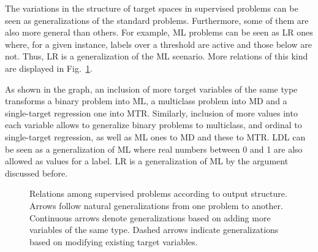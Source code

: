 \documentclass[
	fontsize=11pt, %
	twoside=false, %
	open=any, %
	secnumdepth=1, %
]{kaobook}
\begin{document}
The variations in the structure of target spaces in supervised problems can be seen as generalizations of the standard problems. Furthermore, some of them are also more general than others. For example, ML problems can be seen as LR ones where, for a given instance, labels over a threshold are active and those below are not. Thus, LR is a generalization of the ML scenario. More relations of this kind are displayed in Fig.~\ref{fig.mouttax}.

As shown in the graph, an inclusion of more target variables of the same type transforms a binary problem into ML, a multiclass problem into MD and a single-target regression one into MTR. Similarly, inclusion of more values into each variable allows to generalize binary problems to multiclass, and ordinal to single-target regression, as well as ML ones to MD and these to MTR. LDL can be seen as a generalization of ML where real numbers between 0 and 1 are also allowed as values for a label. LR is a generalization of ML by the argument discussed before.

\begin{figure}[ht]
\centering\scriptsize
{}
\caption{\label{fig.mouttax}Relations among supervised problems according to output structure. Arrows follow natural generalizations from one problem to another. Continuous arrows denote generalizations based on adding more variables of the same type. Dashed arrows indicate generalizations based on modifying existing target variables.}
\end{figure}
\end{document}
